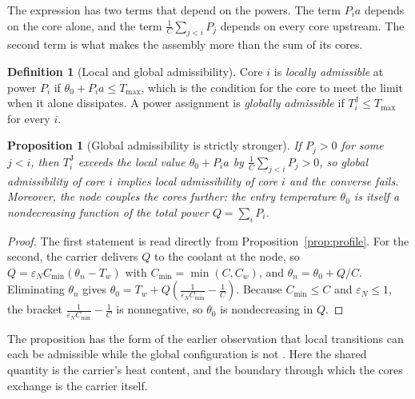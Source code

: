 \documentclass[11pt]{article}
\theoremstyle{definition}
\newtheorem{definition}{Definition}[section]
\theoremstyle{plain}
\newtheorem{proposition}{Proposition}[section]
\theoremstyle{remark}
\begin{document}
The expression has two terms that depend on the powers. The term $P_i a$ depends on the core alone, and the term $\frac1C\sum_{j<i}P_j$ depends on every core upstream. The second term is what makes the assembly more than the sum of its cores.

\begin{definition}[Local and global admissibility]
Core $i$ is \emph{locally admissible} at power $P_i$ if $\theta_0+P_ia\le T_{\max}$, which is the condition for the core to meet the limit when it alone dissipates. A power assignment is \emph{globally admissible} if $T^{\mathrm J}_i\le T_{\max}$ for every $i$.
\end{definition}

\begin{proposition}[Global admissibility is strictly stronger]\label{prop:global}
If $P_j>0$ for some $j<i$, then $T^{\mathrm J}_i$ exceeds the local value $\theta_0+P_ia$ by $\frac1C\sum_{j<i}P_j>0$, so global admissibility of core $i$ implies local admissibility of core $i$ and the converse fails. Moreover, the node couples the cores further: the entry temperature $\theta_0$ is itself a nondecreasing function of the total power $Q=\sum_i P_i$.
\end{proposition}
\begin{proof}
The first statement is read directly from Proposition~\ref{prop:profile}. For the second, the carrier delivers $Q$ to the coolant at the node, so $Q=\varepsilon_N C_{\min}(\theta_n-T_w)$ with $C_{\min}=\min(C,C_w)$, and $\theta_n=\theta_0+Q/C$. Eliminating $\theta_n$ gives $\theta_0=T_w+Q\left(\frac{1}{\varepsilon_N C_{\min}}-\frac1C\right)$. Because $C_{\min}\le C$ and $\varepsilon_N\le1$, the bracket $\frac{1}{\varepsilon_N C_{\min}}-\frac1C$ is nonnegative, so $\theta_0$ is nondecreasing in $Q$.
\end{proof}

The proposition has the form of the earlier observation that local transitions can each be admissible while the global configuration is not \cite{flyxion-local}. Here the shared quantity is the carrier's heat content, and the boundary through which the cores exchange is the carrier itself.
\end{document}
